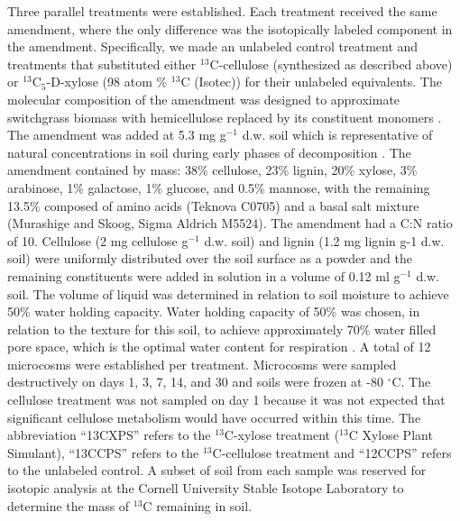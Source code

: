 \documentclass{article}
\begin{document}
Three parallel treatments were established. Each treatment received the same
amendment, where the only difference was the isotopically labeled component in
the amendment. Specifically, we made an unlabeled control treatment and
treatments that substituted either $^{13}$C-cellulose (synthesized as described
above) or $^{13}$C$_{5}$-D-xylose (98 atom \% $^{13}$C (Isotec)) for their
unlabeled equivalents. The molecular composition of the amendment was designed
to approximate switchgrass biomass with hemicellulose replaced by its
constituent monomers \citep{Yan_2010,David_2010}. The amendment was added at
5.3 mg g$^{-1}$ d.w. soil which is representative of natural concentrations in
  soil during early phases of decomposition \citep{Schneckenberger_2008}. The
  amendment contained by mass: 38\% cellulose, 23\% lignin, 20\% xylose, 3\%
  arabinose, 1\% galactose, 1\% glucose, and 0.5\% mannose, with the remaining
13.5\% composed of amino acids (Teknova C0705) and a basal salt mixture
(Murashige and Skoog, Sigma Aldrich M5524). The amendment had a C:N ratio of
10. Cellulose (2 mg cellulose g$^{-1}$ d.w. soil) and lignin (1.2 mg lignin g-1
d.w. soil) were uniformly distributed over the soil surface as a powder and
the remaining constituents were added in solution in a volume of
0.12 ml g$^{-1}$ d.w. soil. The volume of liquid was determined in relation to
soil moisture to achieve 50\% water holding capacity. Water holding capacity
of 50\% was chosen, in relation to the texture for this soil, to achieve
approximately 70\% water filled pore space, which is the optimal water content
for respiration \citep{Linn_1984}. A total of 12 microcosms were established
per treatment. Microcosms were sampled destructively on days 1, 3, 7, 14, and
30 and soils were frozen at -80 $^{\circ}$C. The cellulose treatment was not
sampled on day 1 because it was not expected that significant cellulose
metabolism would have occurred within this time. The abbreviation “13CXPS”
refers to the $^{13}$C-xylose treatment ($^{13}$C Xylose Plant Simulant), “13CCPS”
refers to the $^{13}$C-cellulose treatment and “12CCPS” refers to the unlabeled
control. A subset of soil from each sample was reserved for isotopic
analysis at the Cornell University Stable Isotope Laboratory to determine
the mass of $^{13}$C remaining in soil.
\end{document}
